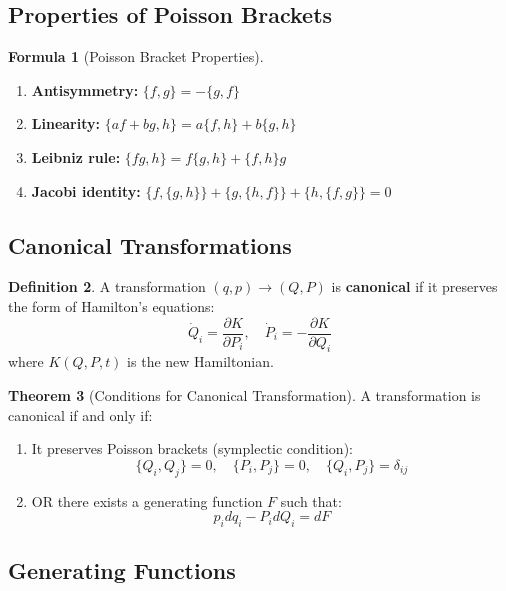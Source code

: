 \documentclass[12pt,a4paper]{article}
\theoremstyle{definition}
\newtheorem{theorem}{Theorem}[section]
\newtheorem{definition}[theorem]{Definition}
\newtheorem{formula}[theorem]{Formula}
\begin{document}
\subsection{Properties of Poisson Brackets}

\begin{formula}[Poisson Bracket Properties]
\begin{enumerate}
    \item \textbf{Antisymmetry:} $\{f, g\} = -\{g, f\}$
    
    \item \textbf{Linearity:} $\{af + bg, h\} = a\{f, h\} + b\{g, h\}$
    
    \item \textbf{Leibniz rule:} $\{fg, h\} = f\{g, h\} + \{f, h\}g$
    
    \item \textbf{Jacobi identity:} $\{f, \{g, h\}\} + \{g, \{h, f\}\} + \{h, \{f, g\}\} = 0$
\end{enumerate}
\end{formula}

\subsection{Canonical Transformations}

\begin{definition}
A transformation $(q, p) \to (Q, P)$ is \textbf{canonical} if it preserves the form of Hamilton's equations:
\[
\dot{Q}_i = \frac{\partial K}{\partial P_i}, \quad \dot{P}_i = -\frac{\partial K}{\partial Q_i}
\]
where $K(Q, P, t)$ is the new Hamiltonian.
\end{definition}

\begin{theorem}[Conditions for Canonical Transformation]
A transformation is canonical if and only if:
\begin{enumerate}
    \item It preserves Poisson brackets (symplectic condition):
    \[
    \{Q_i, Q_j\} = 0, \quad \{P_i, P_j\} = 0, \quad \{Q_i, P_j\} = \delta_{ij}
    \]
    
    \item OR there exists a generating function $F$ such that:
    \[
    p_i dq_i - P_i dQ_i = dF
    \]
\end{enumerate}
\end{theorem}

\subsection{Generating Functions}
\end{document}
